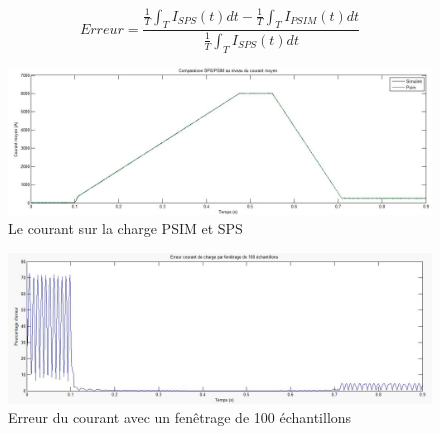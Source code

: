 \documentclass[11pt,letterpaper,final]{report}
\begin{document}
\begin{equation}
Erreur = \frac{\frac{1}{T}\int_T I_{SPS}(t)dt-\frac{1}{T}\int_T I_{PSIM}(t)dt}{\frac{1}{T}\int_T I_{SPS}(t)dt}
\label{eq2}
\end{equation}


\begin{figure}[ht]
\centering
\includegraphics[scale=0.5]{comp_PSIM_SPS.jpg}
\caption{Le courant sur la charge PSIM et SPS}
\label{comp_PSIM_SPS}
\end{figure}


\begin{figure}[ht]
\centering
\includegraphics[scale=0.5]{fig/err_cour_fen.jpg}
\caption{Erreur du courant avec un fenêtrage de 100 échantillons}
\label{err_cou}
\end{figure}
\end{document}
